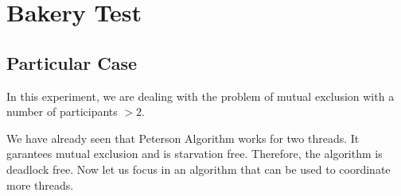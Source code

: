 \section{\textbf{Bakery Test}}
\subsection{Particular Case}
\par
In this experiment, we are dealing with the problem of mutual exclusion with a
number of participants $>2$.
\par
We have already seen that Peterson Algorithm works for two threads. It garantees
mutual exclusion and is starvation free. Therefore, the algorithm is deadlock
free. Now let us focus in an algorithm that can be used to coordinate more
threads.
\par
